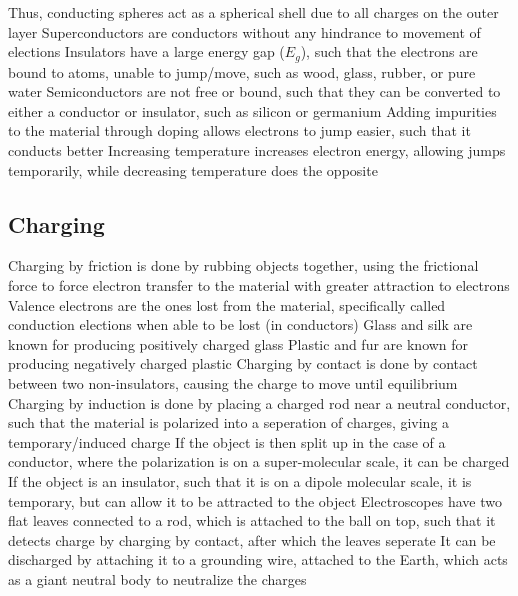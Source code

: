 \documentclass[11 pt, twoside]{article}
\newenvironment{outline*}
{
	\begin{outline}[enumerate]
	}
	{\end{outline}
}
\begin{document}
\begin{outline*}
\3 Thus, conducting spheres act as a spherical shell due to all charges on the outer layer
\3 Superconductors are conductors without any hindrance to movement of elections
\2 Insulators have a large energy gap ($E_g$), such that the electrons are bound to atoms, unable to jump/move, such as wood, glass, rubber, or pure water
\2 Semiconductors are not free or bound, such that they can be converted to either a conductor or insulator, such as silicon or germanium
\3 Adding impurities to the material through doping allows electrons to jump easier, such that it conducts better
\3 Increasing temperature increases electron energy, allowing jumps temporarily, while decreasing temperature does the opposite
\end{outline*}

\subsection{Charging}
\begin{outline*}
\1 Charging by friction is done by rubbing objects together, using the frictional force to force electron transfer to the material with greater attraction to electrons
\2 Valence electrons are the ones lost from the material, specifically called conduction elections when able to be lost (in conductors)
\2 Glass and silk are known for producing positively charged glass
\2 Plastic and fur are known for producing negatively charged plastic
\1 Charging by contact is done by contact between two non-insulators, causing the charge to move until equilibrium
\1 Charging by induction is done by placing a charged rod near a neutral conductor, such that the material is polarized into a seperation of charges, giving a temporary/induced charge
\2 If the object is then split up in the case of a conductor, where the polarization is on a super-molecular scale, it can be charged
\2 If the object is an insulator, such that it is on a dipole molecular scale, it is temporary, but can allow it to be attracted to the object
\1 Electroscopes have two flat leaves connected to a rod, which is attached to the ball on top, such that it detects charge by charging by contact, after which the leaves seperate
\2 It can be discharged by attaching it to a grounding wire, attached to the Earth, which acts as a giant neutral body to neutralize the charges
\end{outline*}
\end{document}
